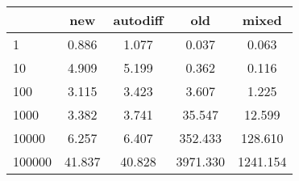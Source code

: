 \begin{tabular}{l|cccc}
\toprule
{} &    new &  autodiff &      old &    mixed \\
\midrule
1      &  0.886 &     1.077 &    0.037 &    0.063 \\
10     &  4.909 &     5.199 &    0.362 &    0.116 \\
100    &  3.115 &     3.423 &    3.607 &    1.225 \\
1000   &  3.382 &     3.741 &   35.547 &   12.599 \\
10000  &  6.257 &     6.407 &  352.433 &  128.610 \\
100000 & 41.837 &    40.828 & 3971.330 & 1241.154 \\
\bottomrule
\end{tabular}
